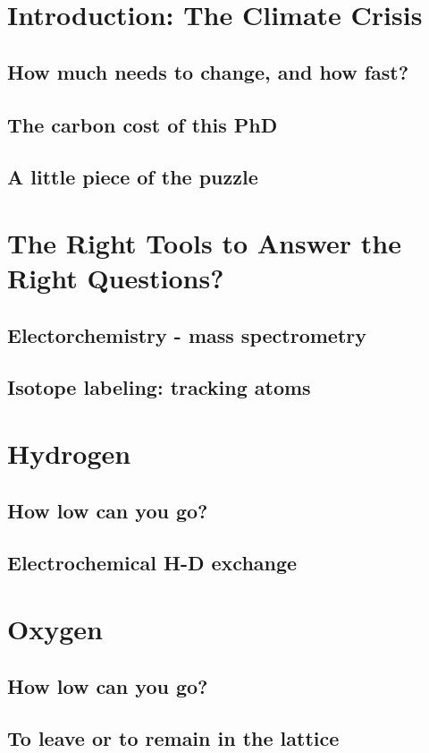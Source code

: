 \documentclass{report}
\begin{document}
\tableofcontents

\chapter{Introduction: The Climate Crisis}
\section{How much needs to change, and how fast?}
\section{The carbon cost of this PhD}
\section{A little piece of the puzzle}

\chapter{The Right Tools to Answer the Right Questions?}
\section{Electorchemistry - mass spectrometry}
\section{Isotope labeling: tracking atoms}

\chapter{Hydrogen}
\section{How low can you go?}
\section{Electrochemical H-D exchange}

\chapter{Oxygen}
\section{How low can you go?}
\section{To leave or to remain in the lattice}
\end{document}
